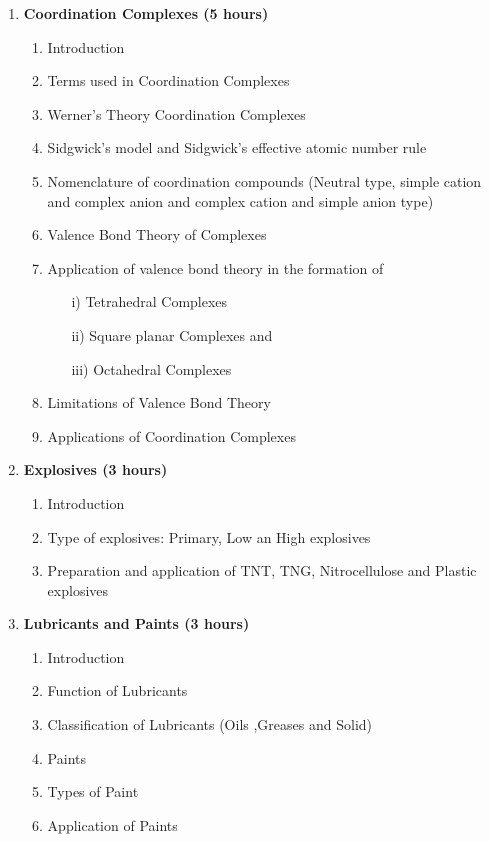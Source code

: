 \begin{enumerate}
    \item \textbf{Coordination Complexes \hfill (5 hours)}
    \begin{enumerate}
        \item Introduction
        \item Terms used in Coordination Complexes
        \item Werner's Theory Coordination Complexes
        \item Sidgwick's model and Sidgwick's effective atomic number rule
        \item Nomenclature of coordination compounds (Neutral type, simple cation and complex anion and complex cation and simple anion type)
        \item Valence Bond Theory of Complexes
        \item Application of valence bond theory in the formation of 
        \begin{itemize}
            \item [i)] Tetrahedral Complexes
            \item [ii)] Square planar Complexes and
            \item [iii)] Octahedral Complexes
        \end{itemize}
        \item Limitations of Valence Bond Theory
        \item Applications of Coordination Complexes
    \end{enumerate}
    
    \item \textbf{Explosives \hfill (3 hours)}
    \begin{enumerate}
        \item Introduction
        \item Type of explosives: Primary, Low an High explosives
        \item Preparation and application of TNT, TNG, Nitrocellulose and Plastic explosives
    \end{enumerate}
    
    \item \textbf{Lubricants and Paints \hfill (3 hours)}
    \begin{enumerate}
        \item Introduction
        \item Function of Lubricants
        \item Classification of Lubricants (Oils ,Greases and Solid)
        \item Paints
        \item Types of Paint
        \item Application of Paints
    \end{enumerate}
    

\end{enumerate}
